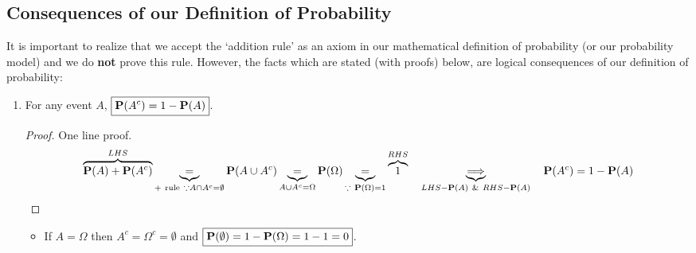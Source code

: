 \subsection{Consequences of our Definition of Probability}\label{S:ConseqDefProb}
It is important to realize that we accept the `addition rule' as an axiom in our mathematical definition of probability (or our probability model) and we do {\bf not} prove this rule.  However, the facts which are stated ({\scriptsize with proofs}) below, are logical consequences of our definition of probability:
\begin{enumerate}
\item For any event $A$, $\boxed{\mathbf{P}(A^c) = 1 - \mathbf{P}(A)}$.
{\scriptsize
\begin{proof}
One line proof.
\[
\overbrace{\mathbf{P}(A) + \mathbf{P}(A^c)}^{LHS} \underbrace{=}_{+~\text{rule}~\because A \cap A^c = \emptyset} \mathbf{P}(A \cup A^c) \underbrace{=}_{A \cup A^c = \Omega} \mathbf{P}(\Omega) \underbrace{=}_{\because~\mathbf{P}(\Omega) = 1} \overbrace{1}^{RHS} \quad \underbrace{\Longrightarrow}_{LHS-\mathbf{P}(A)~\&~RHS-\mathbf{P}(A)} \quad \mathbf{P}(A^c) = 1-\mathbf{P}(A)
\]
\end{proof}
}
\begin{itemize}
\item If $A = \Omega$ then $A^c = \Omega^c = \emptyset$ and 
$\boxed{\mathbf{P}(\emptyset) = 1-\mathbf{P}(\Omega) = 1-1 = 0}$.
\end{itemize}


\end{enumerate}
